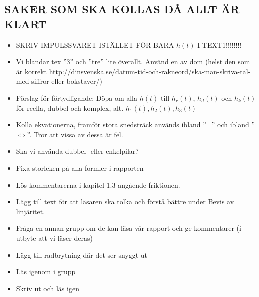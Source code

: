 \subsection{SAKER SOM SKA KOLLAS DÅ ALLT ÄR KLART}
\begin{itemize}
    \item SKRIV IMPULSSVARET ISTÄLLET FÖR BARA $h(t)$ I TEXT1!!!!!!!!
    \item Vi blandar tex ''3'' och ''tre'' lite överallt. Använd en av dom (helst den som är korrekt http://dinsvenska.se/datum-tid-och-rakneord/ska-man-skriva-tal-med-siffror-eller-bokstaver/)
    \item Förslag för förtydligande: Döpa om alla $h(t)$ till $h_r(t)$, $h_d(t)$  och $h_k(t)$ för reella, dubbel och komplex, alt. $h_1(t), h_2(t), h_3(t)$
    \item Kolla ekvationerna, framför stora snedsträck används ibland ''='' och ibland ''$\Longleftrightarrow$''. Tror att vissa av dessa är fel.
    \item Ska vi använda dubbel- eller enkelpilar? 
    \item Fixa storleken på alla formler i rapporten
    \item Lös kommentarerna i kapitel 1.3 angående friktionen.
    \item Lägg till text för att läsaren ska tolka och förstå bättre under Bevis av linjäritet.
    \item Fråga en annan grupp om de kan läsa vår rapport och ge kommentarer (i utbyte att vi läser deras)
    \item Lägg till radbrytning där det ser snyggt ut
    \item Läs igenom i grupp
    \item Skriv ut och läs igen
\end{itemize}